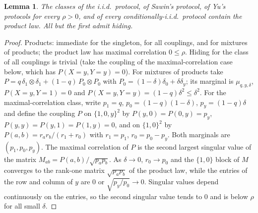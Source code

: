 \documentclass[11pt,a4paper]{article}
\newtheorem{lemma}[theorem]{Lemma}
\theoremstyle{definition}
\theoremstyle{remark}
\begin{document}
\begin{lemma}\label{lem:classes}
The classes of the i.i.d.\ protocol, of Sawin's protocol, of Yu's protocols for every $\rho>0$, and of every conditionally-i.i.d.\ protocol contain the product law. All but the first admit hiding.
\end{lemma}
\begin{proof}
Products: immediate for the singleton, for all couplings, and for mixtures of products; the product law has maximal correlation $0\le\rho$. Hiding for the class of all couplings is trivial (take the coupling of the maximal-correlation case below, which has $P(X=y,Y=y)=0$). For mixtures of products take $P=q\,\delta_1\otimes\delta_1+(1-q)\,P_0\otimes P_0$ with $P_0=(1-\delta)\delta_0+\delta\delta_y$; its marginal is $\mu_{q,y,\delta}$, $P(X=y,Y=1)=0$ and $P(X=y,Y=y)=(1-q)\delta^2\le\delta^2$. For the maximal-correlation class, write $p_1=q$, $p_0=(1-q)(1-\delta)$, $p_y=(1-q)\delta$ and define the coupling $P$ on $\{1,0,y\}^2$ by $P(y,0)=P(0,y)=p_y$, $P(y,y)=P(y,1)=P(1,y)=0$, and on $\{1,0\}^2$ by $P(a,b)=r_ar_b/(r_1+r_0)$ with $r_1=p_1$, $r_0=p_0-p_y$. Both marginals are $(p_1,p_0,p_y)$. The maximal correlation of $P$ is the second largest singular value of the matrix $M_{ab}=P(a,b)/\sqrt{p_ap_b}$. As $\delta\to0$, $r_0\to p_0$ and the $\{1,0\}$ block of $M$ converges to the rank-one matrix $\sqrt{p_ap_b}$ of the product law, while the entries of the row and column of $y$ are $0$ or $\sqrt{p_y/p_0}\to0$. Singular values depend continuously on the entries, so the second singular value tends to $0$ and is below $\rho$ for all small $\delta$.
\end{proof}
\end{document}
